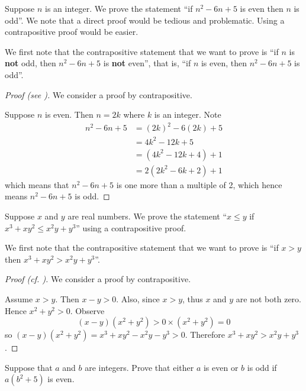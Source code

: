 \begin{example}\label{example-if-(n-1)(n-5)-is-even-then-n-is-odd}
    Suppose $n$ is an integer. We prove the statement ``if $n^2 - 6n + 5$ is even then $n$ is odd''. We note that a direct proof would be tedious and problematic. Using a contrapositive proof would be easier.
    
    We first note that the contrapositive statement that we want to prove is ``if $n$ is \textbf{not} odd, then $n^2 - 6n + 5$ is \textbf{not} even'', that is, ``if $n$ is even, then $n^2 - 6n + 5$ is odd''.
    \begin{proof}[Proof (see {\cite[p.~130]{hammack_2018}})]
        We consider a proof by contrapositive.
        
        Suppose $n$ is even. Then $n = 2k$ where $k$ is an integer. Note
        \begin{align*}
            n^2 - 6n + 5 &= (2k)^2 - 6(2k) + 5\\
            &= 4k^2 - 12k + 5\\
            &= (4k^2 - 12k + 4) + 1\\
            &= 2(2k^2 - 6k + 2) + 1
        \end{align*}
        which means that $n^2 - 6n + 5$ is one more than a multiple of 2, which hence means $n^2 - 6n + 5$ is odd.
    \end{proof}    
\end{example}

\begin{example}
    Suppose $x$ and $y$ are real numbers. We prove the statement ``$x \leq y$ if $x^3 + xy^2 \leq x^2y + y^3$'' using a contrapositive proof.
    
    We first note that the contrapositive statement that we want to prove is ``if $x > y$ then $x^3 + xy^2 > x^2y + y^3$''.

    \begin{proof}[Proof (cf. {\cite[p.~130]{hammack_2018}})]
        We consider a proof by contrapositive.
        
        Assume $x > y$. Then $x - y > 0$. Also, since $x > y$, thus $x$ and $y$ are not both zero. Hence $x^2 + y^2 > 0$.
        Observe
        \[
            (x-y)(x^2+y^2) > 0 \times (x^2+y^2) = 0        
        \]
        so $(x-y)(x^2+y^2) = x^3 + xy^2 - x^2y - y^3 > 0$. Therefore $x^3 + xy^2 > x^2y + y^3$.
    \end{proof}
\end{example}

\begin{exercise}
    Suppose that $a$ and $b$ are integers. Prove that either $a$ is even or $b$ is odd if $a(b^2 + 5)$ is even.
\end{exercise}

